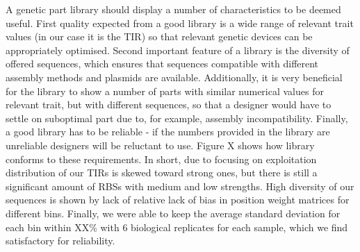 \documentclass{article}
\begin{document}
A genetic part library should display a number of characteristics to be deemed useful.
First quality expected from a good library is a wide range of relevant trait values (in our case it is the TIR) so that relevant genetic devices can be appropriately optimised.
Second important feature of a library is the diversity of offered sequences, which ensures that sequences compatible with different assembly methods and plasmids are available. 
Additionally, it is very beneficial for the library to show a number of parts with similar numerical values for relevant trait, but with different sequences, so that a designer would have to settle on suboptimal part due to, for example, assembly incompatibility.
Finally, a good library has to be reliable - if the numbers provided in the library are unreliable designers will be reluctant to use.
Figure X shows how library conforms to these requirements.
In short, due to focusing on exploitation distribution of our TIRs is skewed toward strong ones, but there is still a significant amount of RBSs with medium and low strengths.
High diversity of our sequences is shown by lack of relative lack of bias in position weight matrices for different bins.
Finally, we were able to keep the average standard deviation for each bin within XX\% with 6 biological replicates for each sample, which we find satisfactory for reliability.\\


\end{document}
